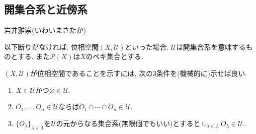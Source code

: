 \documentclass[dvipdfmx,a4paper,11pt]{article}
\theoremstyle{definition}
\begin{document}

 \newpage
 
 
\begin{center}
\section{開集合系と近傍系}
\label{sec-open}
\end{center}

\begin{flushright}
 岩井雅崇(いわいまさたか)
\end{flushright}

以下断りがなければ, 位相空間$(X, \mathscr{U})$といった場合, $\mathscr{U}$は開集合系を意味するものとする. また$\mathcal{P}(X)$は$X$のベキ集合とする.

   \begin{tcolorbox}[
    colback = white,
    colframe = green!35!black,
    fonttitle = \bfseries,
    breakable = true]
$(X, \mathscr{U})$が位相空間であることを示すには, 次の3条件を(機械的に)示せば良い.
\begin{enumerate}
\setlength{\parskip}{0cm}
  	\setlength{\itemsep}{0pt} 
 \item $X \in \mathscr{U}$かつ$\varnothing \in \mathscr{U}$.
    \item $O_1, \ldots, O_n \in \mathscr{U}$ならば$O_1 \cap \cdots \cap O_n \in \mathscr{U}$.
    \item $\{ O_{\lambda} \}_{\lambda \in \Lambda }$を$\mathscr{U}$の元からなる集合系(無限個でもいい)とすると$
    \cup_{ \lambda \in \Lambda  }O_{\lambda} \in \mathscr{U}$.
\end{enumerate}
 \end{tcolorbox}
 
\end{document}
